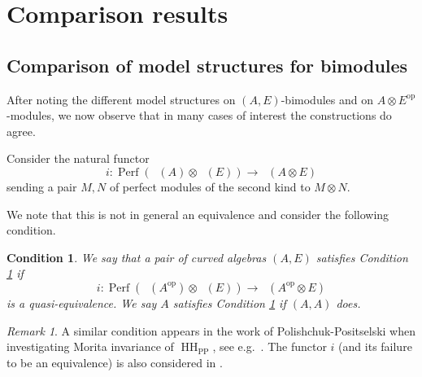 \documentclass[a4paper]{amsart}
\theoremstyle{plain}
\newtheorem{con}{Condition}
\theoremstyle{definition}
\theoremstyle{remark}
\newtheorem{rem}[thm]{Remark}
\DeclareMathOperator{\HH}{HH}
\DeclareMathOperator{\Perf}{Perf}
\DeclareMathOperator{\PerfII}{Perf^{\mathrm{II}}}
\newcommand{\op}{\mathrm{op}}
\numberwithin{equation}{section}
\theoremstyle{plain}
\begin{document}
	
	\section{Comparison results}
	
	\subsection{Comparison of model structures for bimodules}
After noting the different model structures on $(A,E)$-bimodules and on $A\otimes E^\op$-modules, we now observe that in many cases of interest the constructions do agree. 
	

	
	
	
	Consider 
	the natural functor 
	\[
	i \colon \Perf(\PerfII(A)\otimes \PerfII(E))\to  \PerfII(A\otimes E)
	\]
	sending a pair $M, N$ of perfect modules of the second kind to $M \otimes N$.
	
	We note that this is not in general an equivalence and consider the following condition. 
	
\begin{con}\label{con:star}
We say that a pair of curved algebras $(A, E)$ satisfies Condition \ref{con:star} if 	\[
	i \colon \Perf(\PerfII(A^\op)\otimes \PerfII(E))\to  \PerfII(A^\op\otimes E)	
	\]
	is a quasi-equivalence. We say $A$ satisfies Condition \ref{con:star} if $(A, A)$ does.
	\end{con}	
	
	\begin{rem}
		A similar condition appears in the work of Polishchuk-Positselski when investigating Morita invariance of $\HH_{\mathrm{PP}}$, see e.g.\ \cite[Theorem 3.5.C]{pp12}.
		The functor $i$ (and its failure to be an equivalence) is also considered in \cite[Section 2]{briggs2024hochschildhomologycurvedalgebras}.
	\end{rem}
	
	
	
\end{document}
